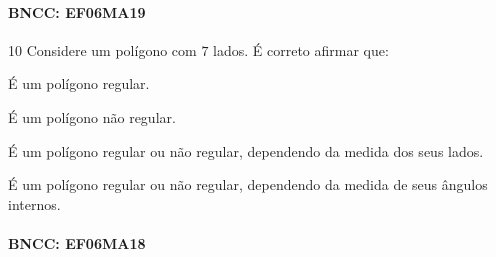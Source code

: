 {\paragraph{BNCC: EF06MA19 }


\num{10} Considere um polígono com $7$ lados. É correto afirmar que:

\begin{escolha}
\item É um polígono regular.
\item É um polígono não regular.
\item É um polígono regular ou não regular, dependendo da medida dos seus
lados.
\item É um polígono regular ou não regular, dependendo da medida de seus
ângulos internos.
\end{escolha}

\paragraph{BNCC: EF06MA18}


}
